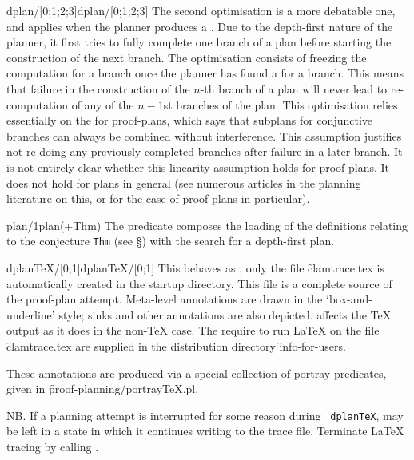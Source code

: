 \begin{predicate}{dplan/[0;1;2;3]}{dplan/[0;1;2;3]}
The second optimisation is a more debatable one, and applies when the
planner produces a . Due to the depth-first nature
of the planner, it first tries to fully complete one branch of a plan
before starting the construction of the next branch. The optimisation
consists of freezing the computation for a branch once the planner has
found a  for a branch. This means that failure in
the construction of the $n$-th branch of a plan will never lead to
re-computation of any of the $n-1$st branches of the plan. This
optimisation relies essentially on the {\em {}\/} for proof-plans, which says that subplans for conjunctive
branches can always be combined without interference. This assumption
justifies not re-doing any previously completed branches after failure
in a later branch. It is not entirely clear whether this linearity
assumption holds for proof-plans. It does not hold for plans in
general (see numerous articles in the planning literature on this,
or \cite{bb421} for the case of proof-plans in particular). 
\end{predicate}

\begin{predicate}{plan/1}{plan(+Thm)}%
The  predicate composes the loading of the 
definitions relating to the conjecture {\tt Thm} 
(see \S{}) with the search for a depth-first 
plan. 
\end{predicate}

\begin{predicate}{dplanTeX/[0;1]}{dplanTeX/[0;1]}%
This behaves as , only the file \f{clamtrace.tex} is
automatically created in the startup directory.  This file is a
complete  source of the proof-plan attempt.
Meta-level annotations are drawn in the `box-and-underline' style;
sinks and other annotations are also depicted.  
affects the \TeX{} output as it does in the non-\TeX{} case.  The
 require to run \LaTeX{} on the file
\f{clamtrace.tex} are supplied in the \clam distribution directory
\f{info-for-users}.

These annotations are produced via a special collection of portray
predicates, given in \f{proof-planning/portrayTeX.pl}.

NB.  If a planning attempt is interrupted for some reason during {\tt
dplanTeX}, \clam{} may be left in a state in which it continues
writing to the trace file.  Terminate \LaTeX{} tracing by calling
.
\end{predicate}

